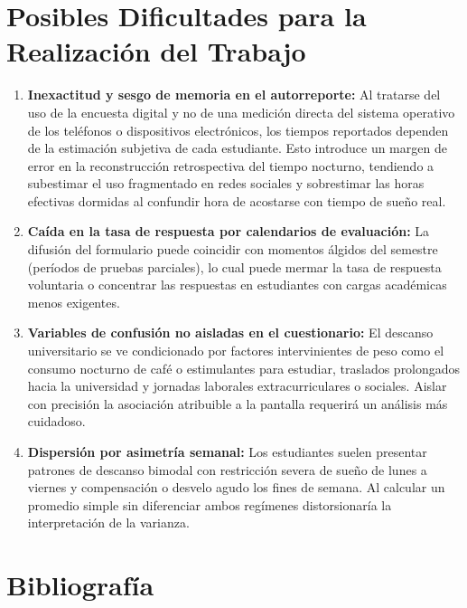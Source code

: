 \documentclass[12pt, letterpaper]{article}
\begin{document}
\section{Posibles Dificultades para la Realización del Trabajo}

\begin{enumerate}
    \item \textbf{Inexactitud y sesgo de memoria en el autorreporte:} Al tratarse del uso de la encuesta digital y no de una medición directa del sistema operativo de los teléfonos o dispositivos electrónicos, los tiempos reportados dependen de la estimación subjetiva de cada estudiante. Esto introduce un margen de error en la reconstrucción retrospectiva del tiempo nocturno, tendiendo a subestimar el uso fragmentado en redes sociales y sobrestimar las horas efectivas dormidas al confundir hora de acostarse con tiempo de sueño real.
    \item \textbf{Caída en la tasa de respuesta por calendarios de evaluación:} La difusión del formulario puede coincidir con momentos álgidos del semestre (períodos de pruebas parciales), lo cual puede mermar la tasa de respuesta voluntaria o concentrar las respuestas en estudiantes con cargas académicas menos exigentes.
    \item \textbf{Variables de confusión no aisladas en el cuestionario:} El descanso universitario se ve condicionado por factores intervinientes de peso como el consumo nocturno de café o estimulantes para estudiar, traslados prolongados hacia la universidad y jornadas laborales extracurriculares o sociales. Aislar con precisión la asociación atribuible a la pantalla requerirá un análisis más cuidadoso.
    \item \textbf{Dispersión por asimetría semanal:} Los estudiantes suelen presentar patrones de descanso bimodal con restricción severa de sueño de lunes a viernes y compensación o desvelo agudo los fines de semana. Al calcular un promedio simple sin diferenciar ambos regímenes distorsionaría la interpretación de la varianza.
\end{enumerate}


\section{Bibliografía}
\end{document}
